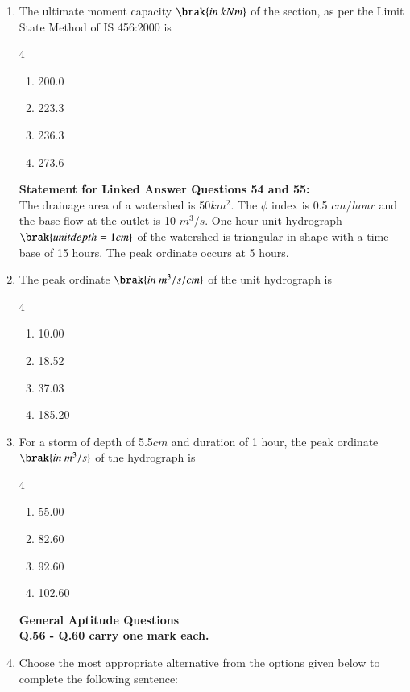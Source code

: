 \documentclass[journal]{IEEEtran}
\begin{document}
\begin{enumerate}
    \item[Q.53] The ultimate moment capacity $\brak{in \ kNm}$ of the section, as per the Limit State Method of IS 456:2000 is 
    \begin{multicols}{4}
    \begin{enumerate}
        \item 200.0
        \item 223.3
        \item 236.3
        \item 273.6
        
    \end{enumerate}
    \end{multicols}
\textbf{Statement for Linked Answer Questions 54 and 55:} \\
 The drainage area of a watershed is 50$km^2$. The $\phi$ index is 0.5 $cm/hour$ and the base flow at the outlet is 10 $m^3/s$. One hour unit hydrograph $\brak{unit depth = 1 cm}$ of the watershed is triangular in shape with a time base of 15 hours. The peak ordinate occurs at 5 hours. 
\item[Q.54] The peak ordinate  $\brak{in \ m^3/s/cm}$ of the unit hydrograph is
\begin{multicols}{4}
\begin{enumerate}
    \item 10.00
    \item 18.52
    \item 37.03
    \item 185.20
\end{enumerate}
    
\end{multicols}
\item[Q.55] For a storm of depth of 5.5$cm$ and duration of 1 hour, the peak ordinate $\brak{in \ m^3/s}$ of the hydrograph is 
\begin{multicols}{4}
\begin{enumerate}
    \item 55.00
    \item 82.60
    \item 92.60
    \item 102.60
\end{enumerate}
    
\end{multicols}
\textbf{General Aptitude  Questions} \\
 \textbf{Q.56 - Q.60 carry one mark each.} \\
 \item[Q.56] Choose the most appropriate alternative from the options given below to complete the following sentence: \\
            

\end{enumerate}
\end{document}
